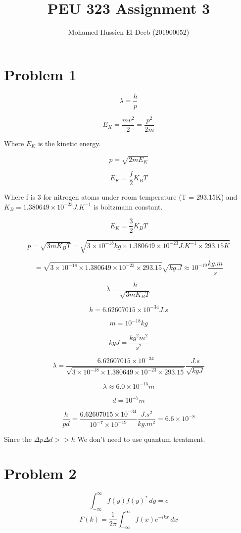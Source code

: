 \documentclass[12pt]{article}
\title{PEU 323 Assignment 3}
\author{Mohamed Hussien El-Deeb (201900052)}
\date{}
\begin{document}
\maketitle
\tableofcontents

\renewcommand{\labelenumi}{\textbf{(\alph{enumi})}}

\newpage

\section{Problem 1}

\[
    \lambda = \frac{h}{p}
\]

\[
    E_K = \frac{mv^2}{2} = \frac{p^2}{2m}
\]

Where $E_K$ is the kinetic energy.

\[
    p = \sqrt{2 m E_K}
\]

\[
    E_K = \frac{f}{2} K_{B} T
\]

Where f is 3 for nitrogen atoms under room temperature (T = 293.15K) and $K_B = 1.380649 \times 10^{-23} J.K^{-1}$ is boltzmann constant.

\[
    E_K = \frac{3}{2} K_{B} T
\]

\[
    p = \sqrt{3 m K_{B} T}
    = \sqrt{3 \times 10^{-18} kg \times 1.380649 \times 10^{-23} J.K^{-1} \times 293.15K}
\]

\[
    = \sqrt{3 \times 10^{-18} \times 1.380649 \times 10^{-23} \times 293.15} \sqrt{kg.J}
    \approx 10^{-19} \frac{kg . m}{s}
\]

\[
    \lambda = \frac{h}{\sqrt{3 m K_{B} T}}
\]

\[
    h = 6.62607015 \times 10^{-34} J.s
\]

\[
    m = 10^{-18} kg
\]

\[
    kg J = \frac{kg^2 m^2}{s^2}
\]

\[
    \lambda = \frac{6.62607015 \times 10^{-34}}{\sqrt{3 \times 10^{-18} \times 1.380649 \times 10^{-23} \times 293.15}} \frac{J.s}{\sqrt{kg J}}
\]

\[
    \lambda \approx 6.0 \times 10^{-15} m
\]

\[
    d = 10^{-7} m
\]

\[
    \frac{h}{p d} = \frac{6.62607015 \times 10^{-34}}{10^{-7} \times 10^{-19}} \frac{J.s^2}{kg . m^2}
    = 6.6 \times 10^{-8}
\]

Since the $\Delta p \Delta d >> h$ We don't need to use quantum treatment.

\newpage

\section{Problem 2}
\[\int_{-\infty}^{\infty} f(y){f(y)}^* \, dy = c\]
\[
    F(k) = \frac{1}{2 \pi} \int_{-\infty}^{\infty} f(x) e^{-ikx}\, dx
\]
\end{document}
